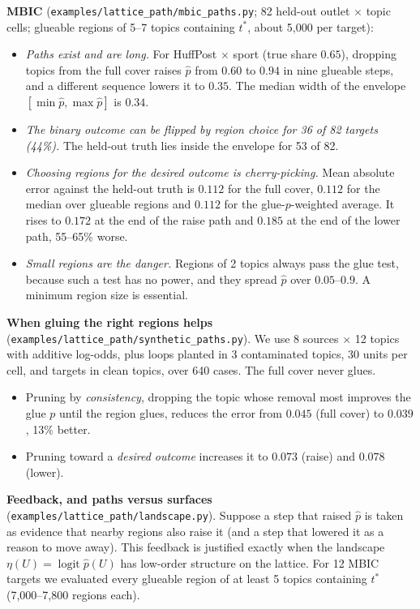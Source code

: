 \documentclass[11pt]{article}
\theoremstyle{definition}
\theoremstyle{remark}
\begin{document}
\textbf{MBIC} (\texttt{examples/lattice\_path/mbic\_paths.py}; 82 held-out outlet $\times$ topic cells; glueable regions of 5--7 topics containing $t^*$, about 5{,}000 per target):
\begin{itemize}
  \item \emph{Paths exist and are long.} For HuffPost $\times$ sport (true share $0.65$), dropping topics from the full cover raises $\hat p$ from $0.60$ to $0.94$ in nine glueable steps, and a different sequence lowers it to $0.35$. The median width of the envelope $[\min\hat p,\max\hat p]$ is $0.34$.
  \item \emph{The binary outcome can be flipped by region choice for 36 of 82 targets (44\%).} The held-out truth lies inside the envelope for 53 of 82.
  \item \emph{Choosing regions for the desired outcome is cherry-picking.} Mean absolute error against the held-out truth is $0.112$ for the full cover, $0.112$ for the median over glueable regions and $0.112$ for the glue-$p$-weighted average. It rises to $0.172$ at the end of the raise path and $0.185$ at the end of the lower path, 55--65\% worse.
  \item \emph{Small regions are the danger.} Regions of 2 topics always pass the glue test, because such a test has no power, and they spread $\hat p$ over $0.05$--$0.9$. A minimum region size is essential.
\end{itemize}

\textbf{When gluing the right regions helps} (\texttt{examples/lattice\_path/synthetic\_paths.py}). We use 8 sources $\times$ 12 topics with additive log-odds, plus loops planted in 3 contaminated topics, 30 units per cell, and targets in clean topics, over 640 cases. The full cover never glues.
\begin{itemize}
  \item Pruning by \emph{consistency}, dropping the topic whose removal most improves the glue $p$ until the region glues, reduces the error from $0.045$ (full cover) to $0.039$, 13\% better.
  \item Pruning toward a \emph{desired outcome} increases it to $0.073$ (raise) and $0.078$ (lower).
\end{itemize}

\textbf{Feedback, and paths versus surfaces} (\texttt{examples/lattice\_path/landscape.py}). Suppose a step that raised $\hat p$ is taken as evidence that nearby regions also raise it (and a step that lowered it as a reason to move away). This feedback is justified exactly when the landscape $\eta(U)=\operatorname{logit}\hat p(U)$ has low-order structure on the lattice. For 12 MBIC targets we evaluated every glueable region of at least 5 topics containing $t^*$ (7{,}000--7{,}800 regions each).
\end{document}
